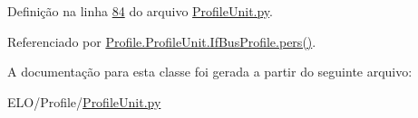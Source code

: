 Definição na linha \hyperlink{ProfileUnit_8py_source_l00084}{84} do arquivo \hyperlink{ProfileUnit_8py_source}{Profile\-Unit.\-py}.



Referenciado por \hyperlink{classProfile_1_1ProfileUnit_1_1IfBusProfile_a996592f4b01e0540f45d042065d5a7f4}{Profile.\-Profile\-Unit.\-If\-Bus\-Profile.\-pers()}.



A documentação para esta classe foi gerada a partir do seguinte arquivo\-:\begin{DoxyCompactItemize}
\item 
E\-L\-O/\-Profile/\hyperlink{ProfileUnit_8py}{Profile\-Unit.\-py}\end{DoxyCompactItemize}
